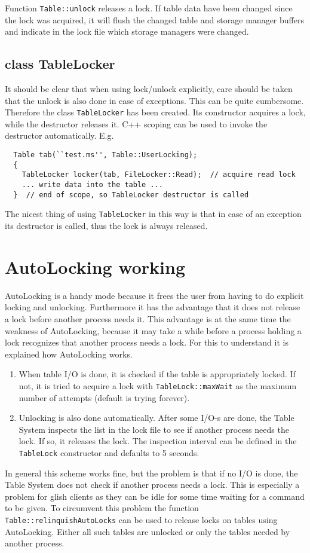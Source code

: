 Function \texttt{Table::unlock} releases a lock. If table data have
been changed since the lock was acquired, it will flush the changed
table and storage manager buffers and indicate in the lock file which
storage managers were changed.

\subsection{class TableLocker}
It should be clear that when using lock/unlock explicitly, care should
be taken that the unlock is also done in case of exceptions. This can
be quite cumbersome. Therefore the class \texttt{TableLocker} has
been created. Its constructor acquires a lock, while the destructor
releases it. C++ scoping can be used to invoke the destructor
automatically. E.g.
\begin{verbatim}
  Table tab(``test.ms'', Table::UserLocking);
  {
    TableLocker locker(tab, FileLocker::Read);  // acquire read lock
    ... write data into the table ...
  }  // end of scope, so TableLocker destructor is called
\end{verbatim}
The nicest thing of using \texttt{TableLocker} in this way is that
in case of an exception
its destructor is called, thus the lock is always released.

\section{\label{TABLELOCK:AUTOLOCKING}AutoLocking working}
AutoLocking is a handy mode because it frees the user from having to
do explicit locking and unlocking. Furthermore it has the advantage
that it does not release a lock before another process needs it.
This advantage is at the same time the weakness of
AutoLocking, because it may take a while before a process holding a
lock recognizes that another process needs a lock. For this to
understand it is explained how AutoLocking works.
\begin{enumerate}
\item When table I/O is done, it is checked if the table is
appropriately locked. If not, it is tried to acquire a lock
with \texttt{TableLock::maxWait} as the maximum number of attempts
(default is trying forever).
\item Unlocking is also done automatically. After some I/O-s are done,
the Table System inspects the list in the lock file to see if another
process needs the lock. If so, it releases the lock.
The inspection interval can be defined in the \texttt{TableLock}
constructor and defaults to 5 seconds.
\end{enumerate}
In general this scheme works fine, but the problem is that if no I/O is
done, the Table System does not check if another process needs a lock.
This is especially a problem for glish clients as they can be idle for
some time waiting for a command to be given. To circumvent this problem
the function \texttt{Table::relinquishAutoLocks} can be used to
release locks on tables using AutoLocking. Either all such tables are
unlocked or only the tables needed by another process.

